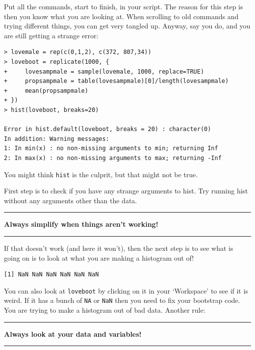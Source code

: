 \documentclass[
  letterpaper,
  DIV=11,
  numbers=noendperiod]{scrreprt}
\begin{document}
Put all the commands, start to finish, in your script. The reason for
this step is then you know what you are looking at. When scrolling to
old commands and trying different things, you can get very tangled up.
Anyway, say you do, and you are still getting a strange error:

\begin{verbatim}
> lovemale = rep(c(0,1,2), c(372, 807,34))
> loveboot = replicate(1000, {
+     lovesampmale = sample(lovemale, 1000, replace=TRUE)
+     propsampmale = table(lovesampmale)[0]/length(lovesampmale)
+     mean(propsampmale)
+ })
> hist(loveboot, breaks=20)

Error in hist.default(loveboot, breaks = 20) : character(0)
In addition: Warning messages:
1: In min(x) : no non-missing arguments to min; returning Inf
2: In max(x) : no non-missing arguments to max; returning -Inf
\end{verbatim}

You might think \texttt{hist} is the culprit, but that might not be
true.

\hfill\break
First step is to check if you have any strange arguments to hist. Try
running hist without any arguments other than the data.

\bgroup \vspace{5mm}
 \noindent\rule{1ex}{1ex}%
      \textbf{ Always simplify when things aren't working! }%
      \rule{1ex}{1ex}
      \vspace{5mm}
\egroup

If that doesn't work (and here it won't), then the next step is to see
what is going on is to look at what you are making a histogram out of!

\begin{verbatim}
[1] NaN NaN NaN NaN NaN NaN
\end{verbatim}

You can also look at \texttt{loveboot} by clicking on it in your
`Workspace' to see if it is weird. If it has a bunch of \texttt{NA} or
\texttt{NaN} then you need to fix your bootstrap code. You are trying to
make a histogram out of bad data. Another rule:

\bgroup \vspace{5mm}
 \noindent\rule{1ex}{1ex}%
      \textbf{Always look at your data and variables!}%
      \rule{1ex}{1ex}
      \vspace{5mm}
\egroup
\end{document}
